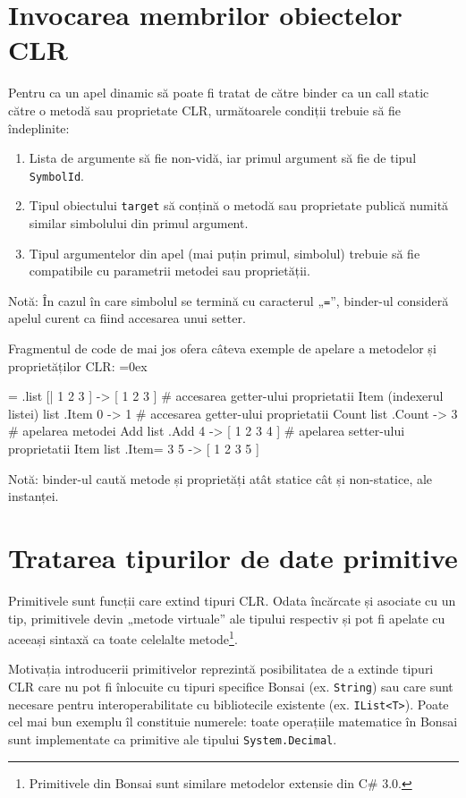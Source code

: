 \documentclass[12pt,a4paper]{memoir}
\renewcommand{\c}{\texttt}
\newenvironment{code}
{
\definecolor{shadecolor}{gray}{0.91}
\topsep=0ex
\relax
\shaded
\verbatim
}
{
\endverbatim
\endshaded
}
\begin{document}
\section{Invocarea membrilor obiectelor CLR}\label{sec:invoking_clr_members}

Pentru ca un apel dinamic să poate fi tratat de către binder ca un call static către o metodă sau proprietate CLR, următoarele condiții trebuie să fie îndeplinite:

\begin{enumerate}
\item Lista de argumente să fie non-vidă, iar primul argument să fie de tipul \c{SymbolId}.
\item Tipul obiectului \c{target} să conțină o metodă sau proprietate publică numită similar simbolului din primul argument.
\item Tipul argumentelor din apel (mai puțin primul, simbolul) trebuie să fie compatibile cu parametrii metodei sau proprietății.
\end{enumerate}

Notă: În cazul în care simbolul se termină cu caracterul „\c{=}”, binder-ul consideră apelul curent ca fiind accesarea unui setter. 

Fragmentul de code de mai jos ofera câteva exemple de apelare a metodelor și proprietăților CLR:
\begin{code}
= .list [| 1 2 3 ]
  -> [ 1 2 3 ]
# accesarea getter-ului proprietatii Item (indexerul listei)
list .Item 0
  -> 1
# accesarea getter-ului proprietatii Count
list .Count
  -> 3
# apelarea metodei Add
list .Add 4
  -> [ 1 2 3 4 ]
# apelarea setter-ului proprietatii Item
list .Item= 3 5
  -> [ 1 2 3 5 ]
\end{code}

Notă: binder-ul caută metode și proprietăți atât statice cât și non-statice, ale instanței. 

\section{Tratarea tipurilor de date primitive}\label{ch:runtime_sec:primitives}

Primitivele sunt funcții care extind tipuri CLR. Odata încărcate și asociate cu un tip, primitivele devin „metode virtuale” ale tipului respectiv și pot fi apelate cu aceeași sintaxă ca toate celelalte metode\footnote{Primitivele din Bonsai sunt similare metodelor extensie din C\# 3.0.}.

Motivația introducerii primitivelor reprezintă posibilitatea de a extinde tipuri CLR care nu pot fi înlocuite cu tipuri specifice Bonsai (ex. \c{String}) sau care sunt necesare pentru interoperabilitate cu bibliotecile existente (ex. \c{IList<T>}). Poate cel mai bun exemplu îl constituie numerele: toate operațiile matematice în Bonsai sunt implementate ca primitive ale tipului \c{System.Decimal}.
\end{document}
